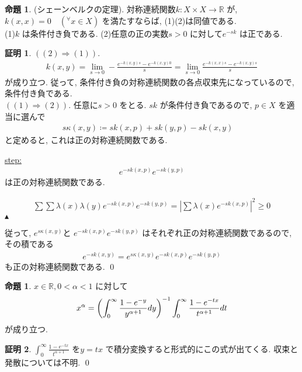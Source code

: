 \documentclass[10pt, fleqn, label-section=none]{bxjsarticle}
\theoremstyle{definition}
\newtheorem{prop}[dfn]{命題}
\newtheorem*{pf*}{証明}
\newcommand{\any}{{}^{\forall}}
\newcommand{\paren}[1]{\mleft( #1\mright )}
\newcommand{\abs}[1]{\left|#1\right|}
\newcommand{\naraba}{\Rightarrow}
\renewcommand{\;}{\, ; \,}
\newenvironment{claim}[1]{\par\noindent\underline{step:}\space#1}{}
\newenvironment{claimproof}[1]{\par\noindent{($\because$)}\space#1}{\hfill $\blacktriangle $}
\begin{document}
\begin{prop}(シェーンベルクの定理). 対称連続関数$k : X \times X \rightarrow \mathbb R$ が, $k(x, x) = 0 \quad (\any x \in X)$ を満たすならば, (1)(2)は同値である. \\
(1)$k$ は条件付き負である. (2)任意の正の実数$s > 0$ に対して$e^{-sk}$ は正である. 

\end{prop}
\begin{pf*}$((2)  \naraba (1)).$ 
\begin{align*} k(x, y) = \lim_{s \rightarrow 0} - \frac{e^{-k(x,y) s} - e^{-k(x,y) 0} }{s} = \lim_{s \rightarrow 0} \frac{e^{- k(x, x) s} - e^{-k(x, y) s}}{s}   \end{align*}
が成り立つ. 従って, 条件付き負の対称連続関数の各点収束先になっているので, 条件付き負である. \\
$((1) \naraba (2))$. 任意に$s > 0$ をとる. $sk$ が条件付き負であるので, $p \in X$ を適当に選んで
\begin{align*} s\kappa(x, y) \coloneqq sk(x, p) + sk(y, p) - sk(x, y) \quad \end{align*}
と定めると, これは正の対称連続関数である. 
\begin{claim}
\begin{align*} e^{-sk(x,p)}e^{-sk(y,p)} \end{align*}
は正の対称連続関数である. 
\end{claim}
\begin{claimproof}
\begin{align*} \sum\sum \lambda(x) \lambda(y)e^{-sk(x,p)}e^{-sk(y,p)}  = \abs{\sum \lambda(x) e^{-sk(x,p)} }^2 \geq 0 \end{align*}
\end{claimproof}

従って, 
$e^{ s\kappa (x,y )} $と $e^{ - sk(x, p)} e^{ - sk(y, p)} $ はそれぞれ正の対称連続関数であるので, その積である
\begin{align*}  e^{ - sk(x,y )} = e^{ s\kappa (x,y )} e^{ - sk(x, p)} e^{ - sk(y, p)} \end{align*}
も正の対称連続関数である. 
\qed
\end{pf*}

\begin{prop}$x \in \mathbb R, 0 < \alpha < 1$ に対して
\begin{align*} x^ \alpha = \paren{\int_0^\infty \frac{1 - e^{-y}}{y^{\alpha + 1}} dy}^{-1} \int_0^\infty \frac{1 - e^{- tx }}{t^{\alpha + 1}} dt  \end{align*}
が成り立つ. 
\end{prop}
\begin{pf*}$\int_0^\infty \frac{1 - e^{- tx }}{t^{\alpha + 1}}  $ を$y = tx$ で積分変換すると形式的にこの式が出てくる. 
収束と発散については不明. 
\qed
\end{pf*}
\end{document}
